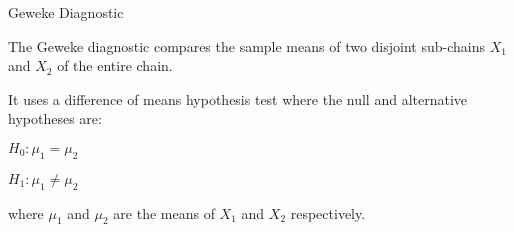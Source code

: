 


\begin{frame}{Geweke Diagnostic}
    \begin{vfilleditems}
        \item The Geweke diagnostic compares the sample means of two disjoint sub-chains $X_1$ and $X_2$ of the entire chain.
        \item It uses a difference of means hypothesis test where the null and alternative hypotheses are:
            \begin{vfilleditems}
                \item $H_0: \mu_1 = \mu_2$
                \item $H_1: \mu_1 \neq \mu_2$
            \end{vfilleditems}
        where $\mu_1$ and $\mu_2$ are the means of $X_1$ and $X_2$ respectively.
    \end{vfilleditems}
\end{frame}

